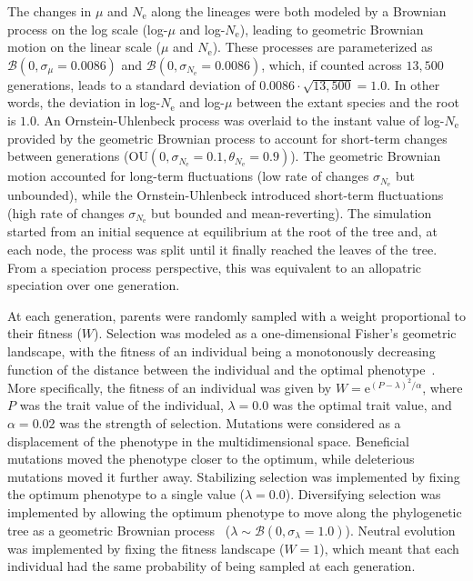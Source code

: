 \documentclass{article}
\newcommand{\Multiply}{\cdot}
\newcommand{\e}{\text{e}}
\newcommand{\Ne}{N_{\text{e}}}
\newcommand{\Trait}{P}
\newcommand{\MutationRatePheno}{\mu}
\newcommand{\brownian}{\mathcal{B}}
\begin{document}
The changes in $\MutationRatePheno$ and $\Ne$ along the lineages were both modeled by a Brownian process on the log scale (log-$\MutationRatePheno$ and log-$\Ne$), leading to geometric Brownian motion on the linear scale ($\MutationRatePheno$ and $\Ne$).
These processes are parameterized as $\brownian \left(0, \sigma_{\MutationRatePheno}=0.0086\right)$ and $\brownian \left(0, \sigma_{\Ne}=0.0086\right)$, which, if counted across $13,500$ generations, leads to a standard deviation of $0.0086 \Multiply \sqrt {13,500} = 1.0$.
In other words, the deviation in log-$\Ne$ and log-$\MutationRatePheno$  between the extant species and the root is $1.0$.
An Ornstein-Uhlenbeck process was overlaid to the instant value of log-$\Ne$ provided by the geometric Brownian process to account for short-term changes between generations ($\text{OU} \left(0, \sigma_{\Ne}=0.1, \theta_{\Ne}=0.9\right)$).
The geometric Brownian motion accounted for long-term fluctuations (low rate of changes $\sigma_{\Ne}$ but unbounded), while the Ornstein-Uhlenbeck introduced short-term fluctuations (high rate of changes $\sigma_{\Ne}$ but bounded and mean-reverting).
The simulation started from an initial sequence at equilibrium at the root of the tree and, at each node, the process was split until it finally reached the leaves of the tree.
From a speciation process perspective, this was equivalent to an allopatric speciation over one generation.

At each generation, parents were randomly sampled with a weight proportional to their fitness ($W$).
Selection was modeled as a one-dimensional Fisher's geometric landscape, with the fitness of an individual being a monotonously decreasing function of the distance between the individual and the optimal phenotype~\citep{tenaillon_utility_2014,blanquart_epistasis_2016}.
More specifically, the fitness of an individual was given by $W = \e^{(\Trait - \lambda)^2/ \alpha}$, where $\Trait$ was the trait value of the individual, $\lambda=0.0$ was the optimal trait value, and $\alpha=0.02$ was the strength of selection.
Mutations were considered as a displacement of the phenotype in the multidimensional space.
Beneficial mutations moved the phenotype closer to the optimum, while deleterious mutations moved it further away.
Stabilizing selection was implemented by fixing the optimum phenotype to a single value ($\lambda=0.0$).
Diversifying selection was implemented by allowing the optimum phenotype to move along the phylogenetic tree as a geometric Brownian process~\citep{hansen_stabilizing_1997} ($\lambda \sim \brownian \left(0, \sigma_{\lambda}=1.0\right)$).
Neutral evolution was implemented by fixing the fitness landscape ($W=1$), which meant that each individual had the same probability of being sampled at each generation.
\end{document}
